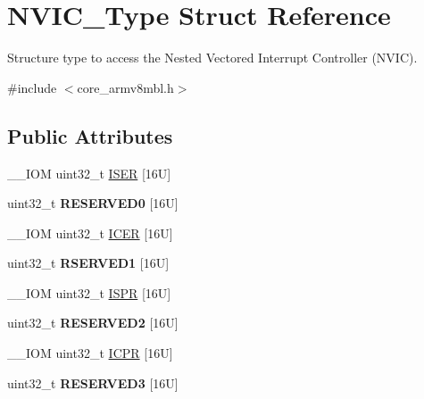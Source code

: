 \hypertarget{struct_n_v_i_c___type}{}\section{N\+V\+I\+C\+\_\+\+Type Struct Reference}
\label{struct_n_v_i_c___type}


Structure type to access the Nested Vectored Interrupt Controller (N\+V\+IC).  




{\ttfamily \#include $<$core\+\_\+armv8mbl.\+h$>$}

\subsection*{Public Attributes}
\begin{DoxyCompactItemize}
\item 
\+\_\+\+\_\+\+I\+OM uint32\+\_\+t \mbox{\hyperlink{struct_n_v_i_c___type_a06726c729c5557701defc4d6b5d8f9f6}{I\+S\+ER}} \mbox{[}16\+U\mbox{]}
\item 
\mbox{\label{struct_n_v_i_c___type_a114b23ee6f1540603908adaedaecc477}} 
uint32\+\_\+t {\bfseries R\+E\+S\+E\+R\+V\+E\+D0} \mbox{[}16\+U\mbox{]}
\item 
\+\_\+\+\_\+\+I\+OM uint32\+\_\+t \mbox{\hyperlink{struct_n_v_i_c___type_aed882e10ea8ee6a915007af71643d7da}{I\+C\+ER}} \mbox{[}16\+U\mbox{]}
\item 
\mbox{\label{struct_n_v_i_c___type_adb1d396e2b2209db1e9a45dd2ed27ca3}} 
uint32\+\_\+t {\bfseries R\+S\+E\+R\+V\+E\+D1} \mbox{[}16\+U\mbox{]}
\item 
\+\_\+\+\_\+\+I\+OM uint32\+\_\+t \mbox{\hyperlink{struct_n_v_i_c___type_a288bc5e8b844a531a6ecdcc8dbcb8050}{I\+S\+PR}} \mbox{[}16\+U\mbox{]}
\item 
\mbox{\label{struct_n_v_i_c___type_a8ed6bf06e09e4ebc57e591fde22c70c3}} 
uint32\+\_\+t {\bfseries R\+E\+S\+E\+R\+V\+E\+D2} \mbox{[}16\+U\mbox{]}
\item 
\+\_\+\+\_\+\+I\+OM uint32\+\_\+t \mbox{\hyperlink{struct_n_v_i_c___type_aa056e3f59e88845ee47db4a43635b3a2}{I\+C\+PR}} \mbox{[}16\+U\mbox{]}
\item 
\mbox{\label{struct_n_v_i_c___type_a33fe3d6f15f4d638ac6a10a370e6f8ed}} 
uint32\+\_\+t {\bfseries R\+E\+S\+E\+R\+V\+E\+D3} \mbox{[}16\+U\mbox{]}

\end{DoxyCompactItemize}
